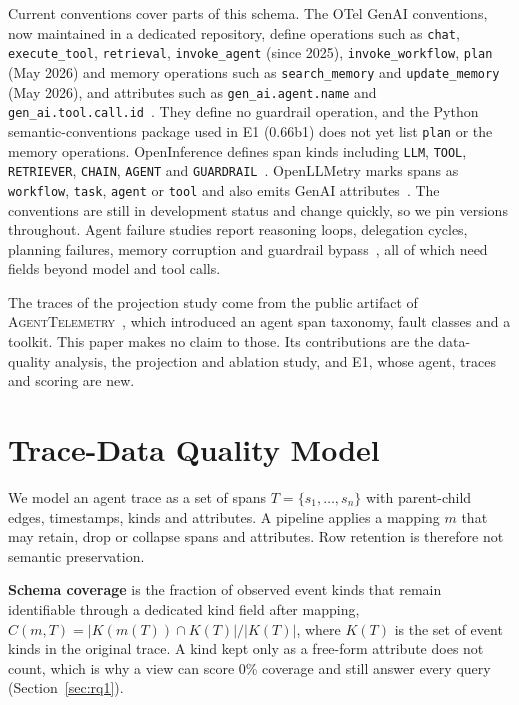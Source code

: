 \documentclass[conference]{IEEEtran}
\begin{document}
Current conventions cover parts of this schema. The OTel GenAI
conventions, now maintained in a dedicated repository, define operations
such as \texttt{chat}, \texttt{execute\_tool}, \texttt{retrieval},
\texttt{invoke\_agent} (since 2025), \texttt{invoke\_workflow},
\texttt{plan} (May 2026) and memory operations such as
\texttt{search\_memory} and \texttt{update\_memory} (May 2026), and
attributes such as \texttt{gen\_ai.agent.name} and
\texttt{gen\_ai.tool.call.id}~\cite{otel_genai,otel_agent_spans,otel_genai_repo}.
They define no guardrail operation, and the Python semantic-conventions
package used in E1 (0.66b1) does not yet list \texttt{plan} or the
memory operations.
OpenInference defines span kinds including \texttt{LLM}, \texttt{TOOL},
\texttt{RETRIEVER}, \texttt{CHAIN}, \texttt{AGENT} and
\texttt{GUARDRAIL}~\cite{openinference}. OpenLLMetry marks spans as
\texttt{workflow}, \texttt{task}, \texttt{agent} or \texttt{tool} and
also emits GenAI attributes~\cite{openllmetry}. The conventions are
still in development status and change quickly, so we pin versions
throughout. Agent failure studies report reasoning loops, delegation
cycles, planning failures, memory corruption and guardrail
bypass~\cite{mast,agentops,agdebugger}, all of which need fields beyond
model and tool calls.

The traces of the projection study come from the public artifact of
\textsc{AgentTelemetry}~\cite{agenttelemetry_aiware,agenttelemetry_artifact},
which introduced an agent span taxonomy, fault classes and a toolkit.
This paper makes no claim to those. Its contributions are the
data-quality analysis, the projection and ablation study, and E1, whose
agent, traces and scoring are new.

\section{Trace-Data Quality Model}
\label{sec:model}

We model an agent trace as a set of spans $T=\{s_1,\ldots,s_n\}$ with
parent-child edges, timestamps, kinds and attributes. A pipeline applies
a mapping $m$ that may retain, drop or collapse spans and attributes.
Row retention is therefore not semantic preservation.

\textbf{Schema coverage} is the fraction of observed event kinds that
remain identifiable through a dedicated kind field after mapping,
$C(m,T) = |K(m(T)) \cap K(T)|/|K(T)|$, where $K(T)$ is the set of event
kinds in the original trace. A kind kept only as a free-form attribute
does not count, which is why a view can score 0\% coverage and still
answer every query (Section~\ref{sec:rq1}).
\end{document}
